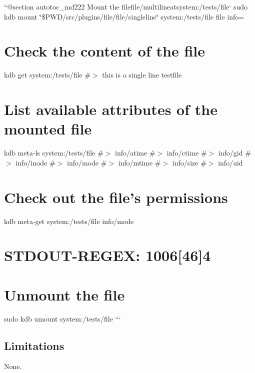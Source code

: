 ``{\ttfamily  @section autotoc\+\_\+md222 Mount the file}file/multiline{\ttfamily at}system\+:/tests/file` sudo kdb mount \char`\"{}\$\+P\+W\+D/src/plugins/file/file/singleline\char`\"{} system\+:/tests/file file info=\hypertarget{autotoc_md217_autotoc_md223}{}\section{Check the content of the file}\label{autotoc_md217_autotoc_md223}
kdb get system\+:/tests/file \#$>$ this is a single line testfile\hypertarget{autotoc_md217_autotoc_md224}{}\section{List available attributes of the mounted file}\label{autotoc_md217_autotoc_md224}
kdb meta-\/ls system\+:/tests/file \#$>$ info/atime \#$>$ info/ctime \#$>$ info/gid \#$>$ info/inode \#$>$ info/mode \#$>$ info/mtime \#$>$ info/size \#$>$ info/uid\hypertarget{autotoc_md217_autotoc_md225}{}\section{Check out the file’s permissions}\label{autotoc_md217_autotoc_md225}
kdb meta-\/get system\+:/tests/file info/mode \hypertarget{autotoc_md217_autotoc_md226}{}\section{S\+T\+D\+O\+U\+T-\/\+R\+E\+G\+E\+X\+: 1006\mbox{[}46\mbox{]}4}\label{autotoc_md217_autotoc_md226}
\hypertarget{autotoc_md217_autotoc_md227}{}\section{Unmount the file}\label{autotoc_md217_autotoc_md227}
sudo kdb umount system\+:/tests/file ```\hypertarget{autotoc_md217_autotoc_md228}{}\subsection{Limitations}\label{autotoc_md217_autotoc_md228}
None. 
